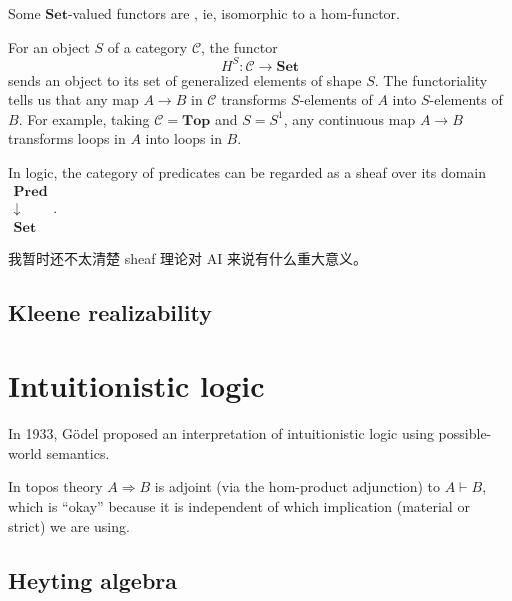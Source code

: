 Some $\mathbf{Set}$-valued functors are , ie, isomorphic to a hom-functor.

For an object $S$ of a category $\mathcal{C}$, the functor
\begin{equation}
H^S : \mathcal{C} \rightarrow \mathbf{Set}
\end{equation}
sends an object to its set of generalized elements of shape $S$.  The functoriality tells us that any map $A \rightarrow B$ in $\mathcal{C}$ transforms $S$-elements of $A$ into $S$-elements of $B$.  For example, taking $\mathcal{C} = \mathbf{Top}$ and $S = S^1$, any continuous map $A \rightarrow B$ transforms loops in $A$ into loops in $B$.

In logic, the category of predicates can be regarded as a sheaf over its domain $\mathrel{\substack{\mathbf{Pred}\\\downarrow\\\mathbf{Set}}}$.

我暂时还不太清楚 sheaf 理论对 AI 来说有什么重大意义。 

\subsection{Kleene realizability}

\underconst

\section{Intuitionistic logic}

In 1933, G\"{o}del proposed an interpretation of intuitionistic logic using possible-world semantics.

In topos theory $A \Rightarrow B$ is adjoint (via the hom-product adjunction) to $A \vdash B$, which is ``okay'' because it is independent of which implication (material or strict) we are using.

\subsection{Heyting algebra}

